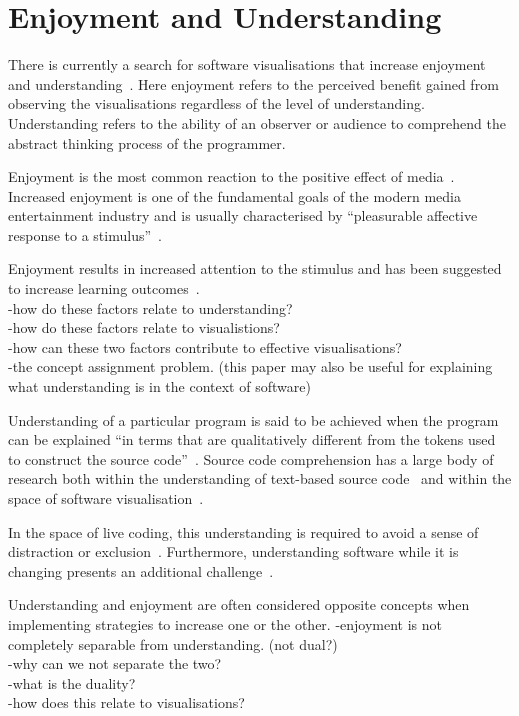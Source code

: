 \section{Enjoyment and Understanding}

There is currently a search for software visualisations that increase enjoyment and understanding~\cite{McLean2010a}. Here enjoyment refers to the perceived benefit gained from observing the visualisations regardless of the level of understanding. Understanding refers to the ability of an observer or audience to comprehend the abstract thinking process of the programmer.

Enjoyment is the most common reaction to the positive effect of media~\cite{Vorderer2004}. Increased enjoyment is one of the fundamental goals of the modern media entertainment industry and is usually characterised by ``pleasurable affective response to a stimulus''~\cite{Brock2004}. 

Enjoyment results in increased attention to the stimulus and has been suggested to increase learning outcomes~.\\
-how do these factors relate to understanding?\\
-how do these factors relate to visualistions?\\
-how can these two factors contribute to effective visualisations?\\
-the concept assignment problem. \cite{Biggerstaff1994} (this paper may also be useful for explaining what understanding is in the context of software)

Understanding of a particular program is said to be achieved when the program can be explained ``in terms that are qualitatively different from the tokens used to construct the source code''~\cite{Biggerstaff1994}. Source code comprehension has a large body of research both within the understanding of text-based source code~ and within the space of software visualisation~\cite{Hosking2005}.

In the space of live coding, this understanding is required to avoid a sense of distraction or exclusion~\cite{McLean2010a}. Furthermore, understanding software while it is changing presents an additional challenge~\cite{Eisenbarth2003}.

Understanding and enjoyment are often considered opposite concepts when implementing strategies to increase one or the other. 
-enjoyment is not completely separable from understanding. (not dual?)\\
-why can we not separate the two?\\
-what is the duality?\\
-how does this relate to visualisations?


